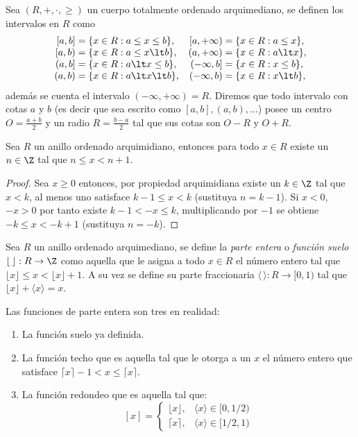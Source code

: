 \documentclass[11pt,oneside,a4paper]{book}
\begin{document}
Sea $(R,+,\cdot,\geq)$ un cuerpo totalmente ordenado arquimediano, se definen los intervalos en $R$ como
$$\begin{array}{r@{\;=\;}lr@{\;=\;}l}
[a,b] &\{x\in R:a\leq x\leq b\}, &[a,+\infty) &\{x\in R:a\leq x\},\\[0cm]
[a,b) &\{x\in R:a\leq x\lt b\}, &(a,+\infty) &\{x\in R:a\lt x\},\\
(a,b] &\{x\in R:a\lt x\leq b\}, &(-\infty,b] &\{x\in R:x\leq b\},\\
(a,b) &\{x\in R:a\lt x\lt b\}, &(-\infty,b) &\{x\in R:x\lt b\},
\end{array}$$
además se cuenta el intervalo $(-\infty,+\infty)=R$. Diremos que todo intervalo con cotas $a$ y $b$ (es decir que sea escrito como $[a,b],(a,b),\dots$) posee un centro $O=\frac{a+b}{2}$ y un radio $R=\frac{b-a}{2}$ tal que sus cotas son $O-R$ y $O+R$.
\begin{thm}
Sea $R$ un anillo ordenado arquimidiano, entonces para todo $x\in R$ existe un $n\in\Z$ tal que $n\leq x\lt n+1$.
\end{thm}
\begin{proof}
Sea $x\geq 0$ entonces, por propiedad arquimidiana existe un $k\in\Z$ tal que $x\lt k$, al menos uno satisface $k-1\leq x\lt k$ (sustituya $n=k-1$). Si $x\lt 0$, $-x\gt 0$ por tanto existe $k-1\lt -x\leq k$, multiplicando por $-1$ se obtiene $-k\leq x\lt -k+1$ (sustituya $n=-k$).
\end{proof}
\begin{mydef}
Sea $R$ un anillo ordenado arquimediano, se define la \textit{parte entera} o \textit{función suelo} $\lfloor\,\rfloor:R\rightarrow\Z$ como aquella que le asigna a todo $x\in R$ el número entero tal que $\lfloor x\rfloor\leq x\lt\lfloor x\rfloor+1$. A su vez se define su parte fraccionaria $\langle\,\rangle:R\rightarrow [0,1)$ tal que $\lfloor x\rfloor+\langle x\rangle=x$.

Las funciones de parte entera son tres en realidad:
\begin{enumerate}
\item La función suelo ya definida.
\item La función techo que es aquella tal que le otorga a un $x$ el número entero que satisface $\lceil x\rceil-1\lt x\leq\lceil x\rceil$.
\item La función redondeo que es aquella tal que:
$$[x]=\begin{cases}
\lfloor x\rfloor, &\langle x\rangle\in [0,1/2)\\
\lceil x\rceil, &\langle x\rangle\in [1/2,1)
\end{cases}$$
\end{enumerate}
\end{mydef}
\end{document}
